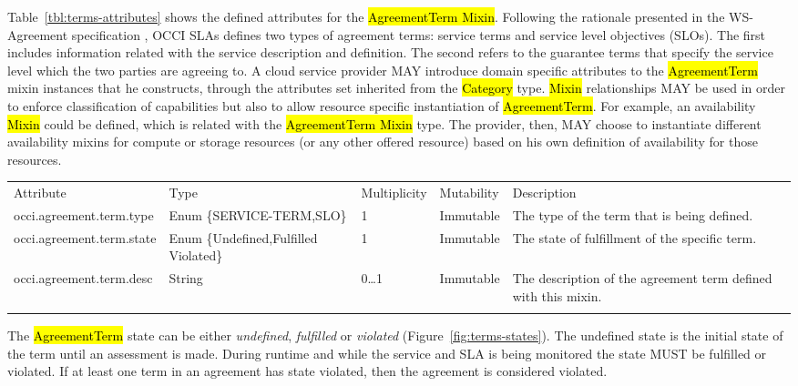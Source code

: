 \documentclass[10pt,a4paper]{article}
\begin{document}
Table~\ref{tbl:terms-attributes} shows the defined attributes for the \hl{AgreementTerm Mixin}. Following the rationale presented in the WS-Agreement specification \cite{ws-agreeement:2007} , OCCI SLAs defines two types of agreement terms: service terms and service level objectives (SLOs). The first includes information related with the service description and definition. The second refers to the guarantee terms that specify the service level which the two parties are agreeing to. A cloud service provider MAY introduce domain specific attributes to the \hl{AgreementTerm} mixin instances that he constructs, through the attributes set inherited from the \hl{Category} type. \hl{Mixin} relationships MAY be used in order to enforce classification of capabilities but also to allow resource specific instantiation of \hl{AgreementTerm}. For example, an availability \hl{Mixin} could be defined, which is related with the \hl{AgreementTerm Mixin} type. The provider, then, MAY choose to instantiate different availability mixins for compute or storage resources (or any other offered resource) based on his own definition of availability for those resources. 



{
	\begin{tabular}{lp{2.5cm}p{1cm}lp{6cm}}
	\toprule
	Attribute&Type&Multi\-plicity&Mutability&Description\\
	\colrule
	occi.agreement.term.type & Enum \{SERVICE-TERM,SLO\} & 1 & Immutable & The type of the term that is being defined.\\
	occi.agreement.term.state & Enum \{Undefined,Fulfilled  Violated\} & 1 & Immutable & The state of fulfillment of the specific term. \\
	occi.agreement.term.desc & String & 0\ldots1 & Immutable & The description of the agreement term defined with this mixin. \\
	\botrule
	\end{tabular}
}



The \hl{AgreementTerm} state can be either \textit{undefined}, \textit{fulfilled} or \textit{violated} (Figure~\ref{fig:terms-states}). The undefined state is the initial state of the term until an assessment is made. During runtime and while the service and SLA is being monitored the state MUST be fulfilled or violated. If at least one term in an agreement has state violated, then the agreement is considered violated.
\end{document}
